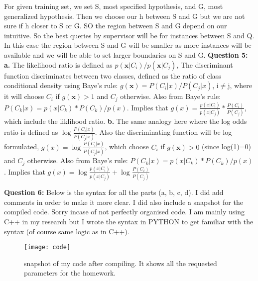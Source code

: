 \documentclass{article}
\begin{document}
For given training set, we set S, most specified hypothesis, and G, most generalized hypothesis. Then we choose our h between S and G but we are not sure if h closer to S or G. SO the region between S and G depend on our intuitive. So the best queries by supervisor will be for instances between S and Q. In this case the region between S and G will be smaller as more instances will be available and we will be able to set larger boundaries on S and G.
\newline
\newline
\textbf{Question 5:}
\newline
\textbf{a.}
The likelihood ratio is defined as $p(\textbf{x}|C_{i})/p(\textbf{x}|C_{j})$, The discriminant function discriminates between two classes, defined as the ratio of class conditional density using Baye's rule:
$g(\textbf{x})=P(C_{i}|x)/P(C_{j}|x)$, i$\neq$j, where it will choose $C_{i}$ if $g(\textbf{x})>1$ and $C_{j}$ otherwise. Also from Baye's rule: $P(C_{k}|x)=p(x|C_{k})*P(C_{k})/p(x)$. Implies that $g(x)= \frac{p(x|C_{i})}{p(x|C_{j})}*\frac{P(C_{i})}{P(C_{j})}$, which include the liklihood ratio.
\newline
\newline
\textbf{b.}
The same analogy here where the log odds ratio is defined as $\log\frac{P(C_{i}|x)}{P(C_{j}|x)}$. Also the discriminating function will be log formulated, $g(x)=\log\frac{P(C_{i}|x)}{P(C_{j}|x)}$, which choose $C_{i}$ if $g(\textbf{x})>0$ (since log(1)=0) and $C_{j}$ otherwise. Also from Baye's rule: $P(C_{k}|x)=p(x|C_{k})*P(C_{k})/p(x)$. Implies that $g(x)=\log\frac{p(x|C_{i})}{p(x|C_{j})}+\log\frac{P(C_{i})}{P(C_{j})}$

\newpage
\textbf{Question 6:}
\newline
Below is the syntax for all the parts (a, b, c, d). I did add comments in order to make it more clear. I did also include a snapshot for the compiled code. Sorry incase of not perfectly organised code. I am mainly using C++ in my research but I wrote the syntax in PYTHON to get familiar with the syntax (of course same logic as in C++).
\begin{figure}
\centering
  \texttt{[image: code]}
  \caption{snapshot of my code after compiling. It shows all the requested parameters for the homework.}
\end{figure}


\end{document}

